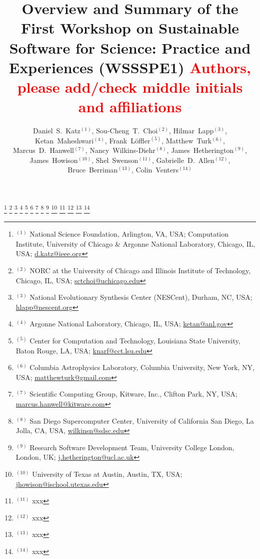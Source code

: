 \documentclass[11pt, oneside]{amsart}
\newcommand{\note}[1]{ {\textcolor{red}    { #1 }}}
\begin{document}
\title[]{Overview and Summary of the First Workshop on Sustainable Software for Science: Practice and Experiences (WSSSPE1) 
\note{\scriptsize Authors, please add/check middle initials and affiliations}}

\author{Daniel~S.~Katz$^{(1)}$,
Sou-Cheng~T.~Choi$^{(2)}$,
Hilmar~Lapp$^{(3)}$,
Ketan~Maheshwari$^{(4)}$,
Frank~Löffler$^{(5)}$, 
Matthew~Turk$^{(6)}$,
Marcus~D.~Hanwell$^{(7)}$,
Nancy~Wilkins-Diehr$^{(8)}$,
James~Hetherington$^{(9)}$, 
James~Howison$^{(10)}$,
Shel~Swenson$^{(11)}$, 
Gabrielle~D.~Allen$^{(12)}$,
Bruce~Berriman$^{(13)}$,
Colin~Venters$^{(14)}$
}

\thanks{{}$^{(1)}$ National Science Foundation, Arlington, VA, USA; Computation Institute, University of Chicago \& Argonne National Laboratory, Chicago, IL, USA; \url{d.katz@ieee.org}}
%
\thanks{{}$^{(2)}$ NORC at the University of Chicago and   Illinois Institute of Technology, Chicago, IL, USA; \url{sctchoi@uchicago.edu}}
%
\thanks{{}$^{(3)}$ National Evolutionary Synthesis Center (NESCent),
  Durham, NC, USA; \url{hlapp@nescent.org}}
%
\thanks{{}$^{(4)}$ Argonne National Laboratory, Chicago, IL, USA; \url{ketan@anl.gov}}
%
\thanks{{}$^{(5)}$ Center for Computation and Technology, Louisiana State University, Baton Rouge, LA, USA; \url{knarf@cct.lsu.edu}}
%
\thanks{{}$^{(6)}$ Columbia Astrophysics Laboratory, Columbia University, New
York, NY, USA; \url{matthewturk@gmail.com}}
%
\thanks{{}$^{(7)}$ Scientific Computing Group, Kitware, Inc.,  Clifton Park, NY, USA; \url{marcus.hanwell@kitware.com}}
%
\thanks{{}$^{(8)}$ San Diego Supercomputer Center, University of California San Diego, La Jolla, CA, USA, \url{wilkinsn@sdsc.edu}}
%
\thanks{{}$^{(9)}$ Research Software Development Team, University College London, London, UK; \url {j.hetherington@ucl.ac.uk}}
%
\thanks{{}$^{(10)}$ University of Texas at Austin, Austin, TX, USA; \url{jhowison@ischool.utexas.edu}}
% 
\thanks{{}$^{(11)}$ xxx}
%
\thanks{{}$^{(12)}$ xxx}
%
\thanks{{}$^{(13)}$ xxx}
%
\thanks{{}$^{(14)}$ xxx}
\end{document}

